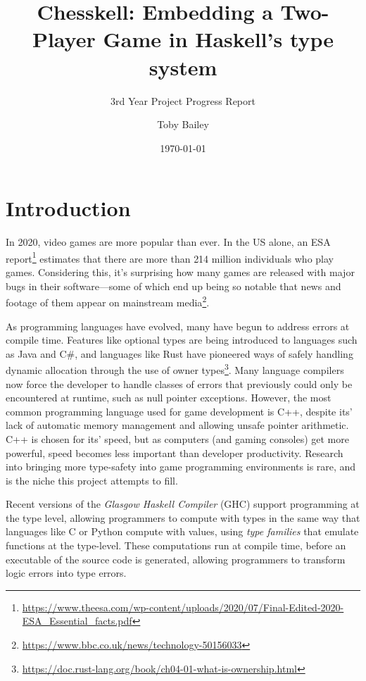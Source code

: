 \documentclass[12pt, a4paper]{scrartcl}
\title{Chesskell: Embedding a Two-Player Game in Haskell's type system}
\subtitle{3rd Year Project Progress Report}
\author{Toby Bailey}
\date{\today}
\begin{document}
\begin{titlepage}
    \maketitle
    \tableofcontents
\end{titlepage}

\section{Introduction}

In 2020, video games are more popular than ever. In the US alone, an ESA report\footnote{\url{https://www.theesa.com/wp-content/uploads/2020/07/Final-Edited-2020-ESA_Essential_facts.pdf}} estimates that there are more than 214 million individuals who play games. Considering this, it's surprising how many games are released with major bugs in their software---some of which end up being so notable that news and footage of them appear on mainstream media\footnote{\url{https://www.bbc.co.uk/news/technology-50156033}}.

As programming languages have evolved, many have begun to address errors at compile time. Features like optional types are being introduced to languages such as Java and C\#, and languages like Rust have pioneered ways of safely handling dynamic allocation through the use of owner types\footnote{\url{https://doc.rust-lang.org/book/ch04-01-what-is-ownership.html}}. Many language compilers now force the developer to handle classes of errors that previously could only be encountered at runtime, such as null pointer exceptions. However, the most common programming language used for game development is C++\cite{gamepp}, despite its' lack of automatic memory management and allowing unsafe pointer arithmetic. C++ is chosen for its' speed, but as computers (and gaming consoles) get more powerful, speed becomes less important than developer productivity. Research into bringing more type-safety into game programming environments is rare, and is the niche this project attempts to fill.

Recent versions of the \emph{Glasgow Haskell Compiler} (GHC) support programming at the type level, allowing programmers to compute with types in the same way that languages like C or Python compute with values\cite{yorgey2012giving}, using \emph{type families} that emulate functions at the type-level. These computations run at compile time, before an executable of the source code is generated, allowing programmers to transform logic errors into type errors\cite{twt}.
\end{document}
